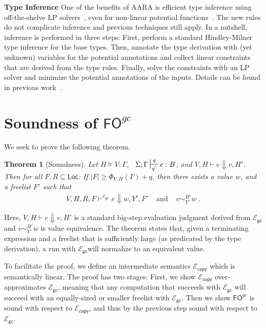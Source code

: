 \documentclass{easychair}
\newtheorem{theorem}{Theorem}
\newcommand{\ms}[1]{\ensuremath{\mathsf{#1}}}
\newcounter{rule}
\newcommand{\veq}[4]{#3 \sim^{#1}_{#2} #4}
\newcommand{\fogc}{\ms{FO}^{gc}}
\newcommand{\gcSem}{\ensuremath{\mathcal{E}_{\ms{gc}}}}
\newcommand{\copySem}{\ensuremath{\mathcal{E}_{\ms{copy}}}}
\theoremstyle{definition}
\begin{document}
{\bf Type Inference} One of the benefits of AARA is efficient type
inference using off-the-shelve LP solvers~\cite{Jost03}, even for
non-linear potential functions~\cite{HoffmannAH10,HoffmannW15}. The
new rules do not complicate inference and previous techniques still
apply. In a nutshell, inference is performed in three steps: First,
perform a standard Hindley-Milner type inference for the base
types. Then, annotate the type derivation with (yet unknown) variables
for the potential annotations and collect linear constraints that are
derived from the type rules. Finally, solve the constraints with an LP
solver and minimize the potential annotations of the inputs. Details
can be found in previous work~\cite{Jost03,HoffmannW15}.



\section{Soundness of $\fogc$}

We seek to prove the following theorem.

\begin{theorem}[Soundness]
\label{itm:soundness} Let $H \vDash V {:} \Gamma$, $\;\; \Sigma; \Gamma \sststile{q'}{q} e : B$,
and $V,H \vdash e \Downarrow v, H'$.
Then for all $F,R \subseteq \ms{Loc}$:
If $|F| \ge \Phi_{V,H}(\Gamma) + q$,
then there exists a value $w$, and a freelist $F'$ such that
$$
\begin{array}{ccc}
	V,H,R,F \vdash^{\gcSem} e \Downarrow w, Y', F'  & \text{ and } & \veq{H'}{Y'}{v}{w} \; .
\end{array}
$$
\end{theorem}

Here, $V,H \vdash e \Downarrow v, H'$ is a standard big-step evaluation judgment
derived from \gcSem{} and $\veq{H'}{Y'}{v}{w}$ is value equivalence. The theorem states that,
given a terminating expression
and a freelist that is sufficiently large (as predicated by the type derivation), 
a run with \gcSem will normalize to an equivalent value.

To facilitate the proof, we define an intermediate semantics
\copySem{} which is semantically linear. The proof has two stages:
First, we show \copySem{} over-approximates \gcSem, meaning that any
computation that succeeds with \gcSem{} will succeed with an
equally-sized or smaller freelist with \gcSem{}. Then we show $\fogc$
is sound with respect to \copySem{}, and thus by the previous step sound with respect to
\gcSem{}.
\end{document}
